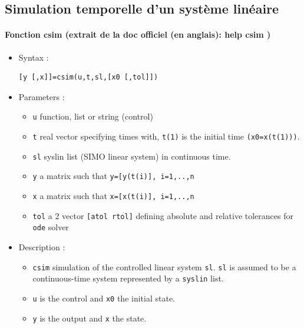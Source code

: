 \newpage

\subsection{Simulation temporelle d'un système linéaire}

\begin{doc}
\paragraph{Fonction csim (extrait de la doc officiel (en anglais): help csim )}
\begin{itemize}
    \item Syntax :
    \begin{code}
\begin{verbatim}
[y [,x]]=csim(u,t,sl,[x0 [,tol]])
\end{verbatim}
    \end{code}
    \item Parameters :
    \begin{itemize}
        \item \verb?u?  function, list or string (control)
        \item \verb?t?  real vector specifying times with, \verb?t(1)? is the 
              initial time \verb?(x0=x(t(1)))?.
        \item \verb?sl? syslin list (SIMO linear system) in continuous time.
        \item \verb?y?  a matrix such that \verb?y=[y(t(i)], i=1,..,n?
        \item \verb?x?  a matrix such that \verb?x=[x(t(i)], i=1,..,n?
        \item \verb?tol? a 2 vector \verb?[atol rtol]? defining absolute and 
              relative tolerances for \verb?ode? solver
    \end{itemize}

    \item Description :

    \begin{itemize} 
        \item \verb?csim? simulation of the controlled linear system \verb?sl?.
              \verb?sl? is assumed to be a continuous-time system represented 
              by a \verb?syslin? list.
        \item \verb?u?  is the control and \verb?x0? the initial state.
        \item \verb?y?  is the output and \verb?x? the state.
    \end{itemize}


\end{itemize}
\end{doc}
